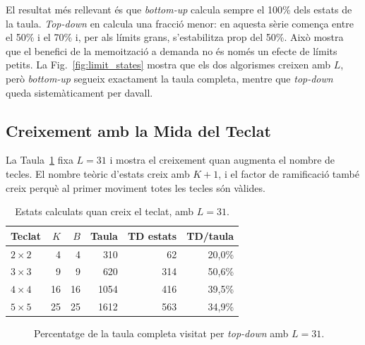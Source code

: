 \documentclass[conference,compsoc]{IEEEtran}
\begin{document}
El resultat més rellevant és que \textit{bottom-up} calcula sempre el 100\% dels
estats de la taula. \textit{Top-down} en calcula una fracció menor: en aquesta
sèrie comença entre el 50\% i el 70\% i, per als límits grans, s'estabilitza prop
del 50\%. Això mostra que el benefici de la memoització a demanda no és només un
efecte de límits petits. La Fig.~\ref{fig:limit_states} mostra que els dos
algorismes creixen amb $L$, però \textit{bottom-up} segueix exactament la taula
completa, mentre que \textit{top-down} queda sistemàticament per davall.

\subsection{Creixement amb la Mida del Teclat}

La Taula~\ref{tab:size} fixa $L=31$ i mostra el creixement quan augmenta el
nombre de tecles. El nombre teòric d'estats creix amb $K+1$, i el factor de
ramificació també creix perquè al primer moviment totes les tecles són vàlides.

\begin{table}[H]
\centering
\caption{Estats calculats quan creix el teclat, amb $L=31$.}
\label{tab:size}
\scriptsize
\begin{tabular}{@{}lrrrrr@{}}
\toprule
\textbf{Teclat} & \textbf{$K$} & \textbf{$B$} & \textbf{Taula} & \textbf{TD estats} & \textbf{TD/taula} \\
\midrule
$2\times2$ & 4  & 4  & 310  & 62  & 20,0\% \\
$3\times3$ & 9  & 9  & 620  & 314 & 50,6\% \\
$4\times4$ & 16 & 16 & 1054 & 416 & 39,5\% \\
$5\times5$ & 25 & 25 & 1612 & 563 & 34,9\% \\
\bottomrule
\end{tabular}
\end{table}

\begin{figure}[H]
\centering
{}
\caption{Percentatge de la taula completa visitat per \textit{top-down} amb $L=31$.}
\label{fig:size_ratio}
\end{figure}
\end{document}
